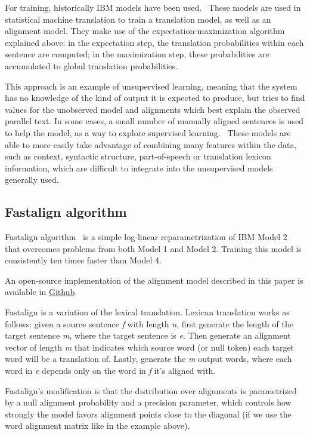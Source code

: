 For training, historically IBM models have been used.~\cite{koehn2009statistical} These models are used in statistical machine translation to train a translation model, as well as an alignment model. They make use of the expectation-maximization algorithm explained above: in the expectation step, the translation probabilities within each sentence are computed; in the maximization step, these probabilities are accumulated to global translation probabilities.

This approach is an example of unsupervised learning, meaning that the system has no knowledge of the kind of output it is expected to produce, but tries to find values for the unobserved model and alignments which best explain the observed parallel text. In some cases, a small number of manually aligned sentences is used to help the model, as a way to explore supervised learning.~\cite{varga2007parallel} These models are able to more easily take advantage of combining many features within the data, such as context, syntactic structure, part-of-speech or translation lexicon information, which are difficult to integrate into the unsupervised models generally used.

\subsection{Fastalign algorithm}

Fastalign algorithm~\cite{dyer-etal-2013-simple} is a simple log-linear reparametrization of IBM Model 2 that overcomes problems from both Model 1 and Model 2. Training this model is consistently ten times faster than Model 4.

An open-source implementation of the alignment model described in this paper is available in \href{http://github.com/clab/fast align}{Github}.

Fastalign is a variation of the lexical translation. Lexican translation works as follows: given a source sentence \emph{f} with length \emph{n}, first generate the length of the target sentence \emph{m}, where the target sentence is \emph{e}. Then generate an alignment vector of length \emph{m} that indicates which source word (or null token) each target word will be a translation of. Lastly, generate the \emph{m} output words, where each word in \emph{e} depends only on the word in \emph{f} it's aligned with.

Fastalign's modification is that the distribution over alignments is parametrized by a null alignment probability and a precision parameter, which controls how strongly the model favors alignment points close to the diagonal (if we use the word alignment matrix like in the example above).

